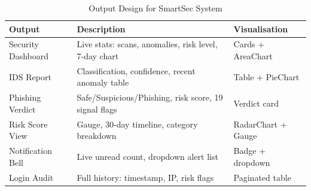 \begin{table}[H]
\centering
\caption{Output Design for SmartSec System}
\begin{tabular}{|p{3.5cm}|p{5cm}|p{3cm}|}
\hline
\textbf{Output} & \textbf{Description} & \textbf{Visualisation} \\
\hline
Security Dashboard & Live stats: scans, anomalies, risk level, 7-day chart & Cards + AreaChart \\
IDS Report & Classification, confidence, recent anomaly table & Table + PieChart \\
Phishing Verdict & Safe/Suspicious/Phishing, risk score, 19 signal flags & Verdict card \\
Risk Score View & Gauge, 30-day timeline, category breakdown & RadarChart + Gauge \\
Notification Bell & Live unread count, dropdown alert list & Badge + dropdown \\
Login Audit & Full history: timestamp, IP, risk flags & Paginated table \\
\hline
\end{tabular}
\end{table}
